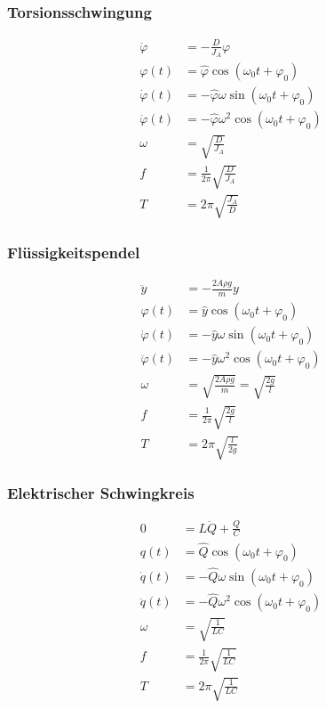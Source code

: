 \newpage
\begin{multicols}{2}{}
\subsubsection{Torsionsschwingung}
\begin{align*}
\ddot{\varphi}&=-\frac{D}{J_A}\varphi\\
\varphi(t)&=\hat{\varphi}\cos(\omega_0 t+\varphi_0)\\
\dot{\varphi}(t)&=-\hat{\varphi}\omega\sin(\omega_0 t+\varphi_0)\\
\ddot{\varphi}(t)&=-\hat{\varphi}\omega^2\cos(\omega_0 t+\varphi_0)\\
\omega&=\sqrt{\frac{D}{J_A}}\\
f&=\frac{1}{2\pi}\sqrt{\frac{D}{J_A}}\\
T&=2\pi\sqrt{\frac{J_A}{D}}
\end{align*}



\subsubsection{Flüssigkeitspendel}
\begin{align*}
\ddot{y}&=-\frac{2A\rho g}{m}y\\
\varphi(t)&=\hat{y}\cos(\omega_0 t+\varphi_0)\\
\dot{\varphi}(t)&=-\hat{y}\omega\sin(\omega_0 t+\varphi_0)\\
\ddot{\varphi}(t)&=-\hat{y}\omega^2\cos(\omega_0 t+\varphi_0)\\
\omega&=\sqrt{\frac{2A\rho g}{m}}=\sqrt{\frac{2g}{l}}\\
f&=\frac{1}{2\pi}\sqrt{\frac{2g}{l}}\\
T&=2\pi\sqrt{\frac{l}{2g}}
\end{align*}
\end{multicols}

\subsubsection{Elektrischer Schwingkreis}
\begin{align*}
0&=L\ddot{Q}+\frac{Q}{C}\\
q(t)&=\hat{Q}\cos(\omega_0 t+\varphi_0)\\
\dot{q}(t)&=-\hat{Q}\omega\sin(\omega_0 t+\varphi_0)\\
\ddot{q}(t)&=-\hat{Q}\omega^2\cos(\omega_0 t+\varphi_0)\\
\omega&=\sqrt{\frac{1}{LC}}\\
f&=\frac{1}{2\pi}\sqrt{\frac{1}{LC}}\\
T&=2\pi\sqrt{\frac{1}{LC}}
\end{align*}



